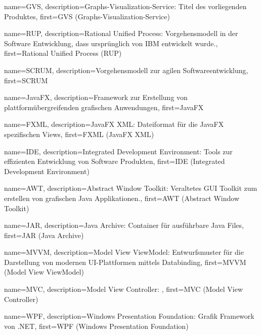 



{
	name={GVS},
	description={Graphs-Visualization-Service: Titel des vorliegenden Produktes},
	first={GVS (Graphs-Visualization-Service)}
}

{
	name={RUP},
	description={Rational Unified Process: Vorgehensmodell in der Software Entwicklung, dass ursprünglich von IBM entwickelt wurde.},
	first={Rational Unified Process (RUP)}
}

{
	name={SCRUM},
	description={Vorgehensmodell zur agilen Softwareentwicklung},
	first={SCRUM}
}

{
	name={JavaFX},
	description={Framework zur Erstellung von plattformübergreifenden grafischen Anwendungen},
	first={JavaFX}
}

{
	name={FXML},
	description={JavaFX XML: Dateiformat für die JavaFX spezifischen Views},
	first={FXML (JavaFX XML)}
}

{
	name={IDE},
	description={Integrated Development Environment: Tools zur effizienten Entwicklung von Software Produkten},
	first={IDE (Integrated Development Environment)}
}

{
	name={AWT},
	description={Abstract Window Toolkit: Veraltetes GUI Toolkit zum erstellen von grafischen Java Applikationen.},
	first={AWT (Abstract Window Toolkit)}
}

{
	name={JAR},
	description={Java Archive: Container für ausführbare Java Files},
	first={JAR (Java Archive)}
}

{
	name={MVVM},
	description={Model View ViewModel: Entwurfsmuster für die Darstellung von modernen UI-Plattformen mittels Databinding},
	first={MVVM (Model View ViewModel)}
}

{
	name={MVC},
	description={Model View Controller: },
	first={MVC (Model View Controller)}
}

{
	name={WPF},
	description={Windows Presentation Foundation: Grafik Framework von .NET},
	first={WPF (Windows Presentation Foundation)}
}



